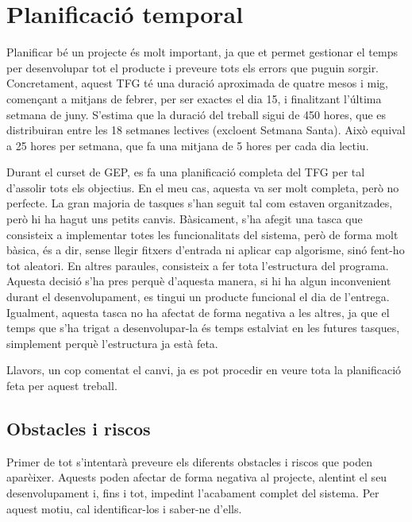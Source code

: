 \documentclass[a4paper]{article}
\begin{document}
\newpage
\section{Planificació temporal}
Planificar bé un projecte és molt important, ja que et permet gestionar el temps per desenvolupar tot el producte i preveure tots els errors que puguin sorgir. Concretament, aquest TFG té una duració aproximada de quatre mesos i mig, començant a mitjans de febrer, per ser exactes el dia 15, i finalitzant l'última setmana de juny. S'estima que la duració del treball sigui de 450 hores, que es distribuiran entre les 18 setmanes lectives (excloent Setmana Santa). Això equival a 25 hores per setmana, que fa una mitjana de 5 hores per cada dia lectiu. 

Durant el curset de GEP, es fa una planificació completa del TFG per tal d'assolir tots els objectius. En el meu cas, aquesta va ser molt completa, però no perfecte. La gran majoria de tasques s'han seguit tal com estaven organitzades, però hi ha hagut uns petits canvis. Bàsicament, s'ha afegit una tasca que consisteix a implementar totes les funcionalitats del sistema, però de forma molt bàsica, és a dir, sense llegir fitxers d'entrada ni aplicar cap algorisme, sinó fent-ho tot aleatori. En altres paraules, consisteix a fer tota l'estructura del programa. Aquesta decisió s'ha pres perquè d'aquesta manera, si hi ha algun inconvenient durant el desenvolupament, es tingui un producte funcional el dia de l'entrega. Igualment, aquesta tasca no ha afectat de forma negativa a les altres, ja que el temps que s'ha trigat a desenvolupar-la és temps estalviat en les futures tasques, simplement perquè l'estructura ja està feta.

Llavors, un cop comentat el canvi, ja es pot procedir en veure tota la planificació feta per aquest treball.
\subsection{Obstacles i riscos}
Primer de tot s'intentarà preveure els diferents obstacles i riscos que poden aparèixer. Aquests poden afectar de forma negativa al projecte, alentint el seu desenvolupament i, fins i tot, impedint l'acabament complet del sistema. Per aquest motiu, cal identificar-los i saber-ne d'ells.
\end{document}
